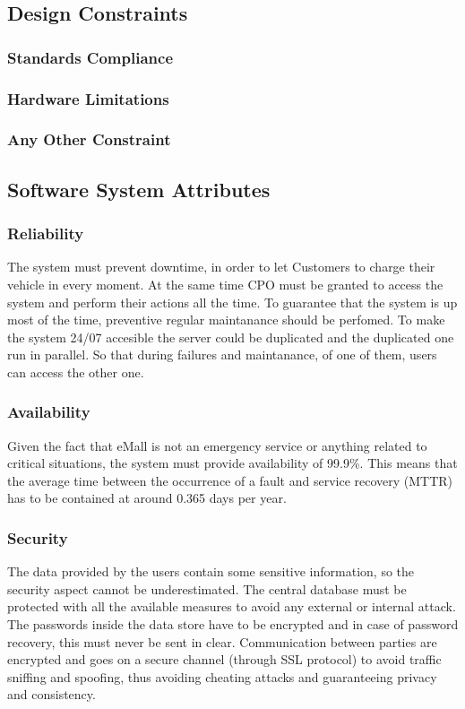 \subsection{Design Constraints}
\subsubsection{Standards Compliance}
\subsubsection{Hardware Limitations}
\subsubsection{Any Other Constraint}

\subsection{Software System Attributes}
\subsubsection{Reliability}
The system must prevent downtime, in order to let Customers to charge their vehicle in every moment. At the same time CPO must be granted to access the system and perform their actions all the time.
To guarantee that the system is up most of the time, preventive regular maintanance should be perfomed. To make the system 24/07 accesible the server could be duplicated and the duplicated one run in parallel. So that during failures and maintanance, of one of them, users can access the other one.
\subsubsection{Availability}
Given the fact that eMall is not an emergency service or anything related to critical situations, the system must provide availability of 99.9\%. This means that the average time between the occurrence of a fault and service recovery (MTTR) has to be contained at around 0.365 days per year. 
\subsubsection{Security}
The data provided by the users contain some sensitive information, so the security aspect cannot be underestimated. The central database must be protected with all the available measures to avoid any external or internal attack. The passwords inside the data store have to be encrypted and in case of password recovery, this must never be sent in clear.
Communication between parties are encrypted and goes on a secure channel (through SSL protocol) to avoid traffic sniffing and spoofing, thus avoiding cheating attacks and guaranteeing privacy and consistency.
